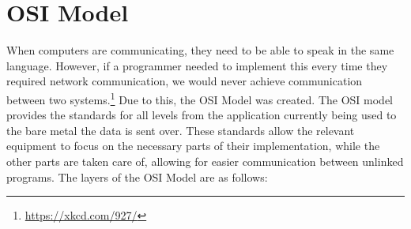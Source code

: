 \documentclass[a4paper,11pt]{report}
\begin{document}
	\section{OSI Model}
		When computers are communicating, they need to be able to speak in the same language.\cite{HackingAOE} 
		However, if a programmer needed to implement this every time they required network communication, we would never achieve communication between two systems.\footnote{\url{https://xkcd.com/927/}} 
		Due to this, the OSI Model was created. 
		The OSI model provides the standards for all levels from the application currently being used to the bare metal the data is sent over. 
		These standards allow the relevant equipment to focus on the necessary parts of their implementation, while the other parts are taken care of, allowing for easier communication between unlinked programs. 
		The layers of the OSI Model are as follows:
\end{document}
